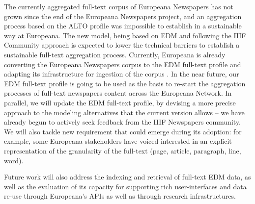 \documentclass[a4paper,UKenglish,cleveref, autoref]{oasics-v2019}
\begin{document}
The currently aggregated full-text corpus of Europeana Newspapers has not grown since the end of the Europeana Newspapers project, and an aggregation process based on the ALTO profile was impossible to establish in a sustainable way at Europeana. The new model, being based on EDM and following the IIIF Community approach is expected to lower the technical barriers to establish a sustainable full-text aggregation process. Currently, Europeana is already converting the Europeana Newspapers corpus to the EDM full-text profile and adapting its infrastructure for ingestion of the corpus . In the near future, our EDM full-text profile is going to be used as the basis to re-start the aggregation processes of full-text newspapers content across the Europeana Network. In parallel, we will update the EDM full-text profile, by devising a more precise approach to the modeling alternatives that the current version allows – we have already begun to actively seek feedback from the IIIF Newspapers community. We will also tackle new requirement that could emerge during its adoption: for example, some Europeana stakeholders have voiced interested in an explicit representation of the granularity of the full-text (page, article, paragraph, line, word).

Future work will also address the indexing and retrieval of full-text EDM data, as well as the evaluation of its capacity for supporting rich user-interfaces and data re-use through Europeana's APIs as well as through research infrastructures.




\end{document}
